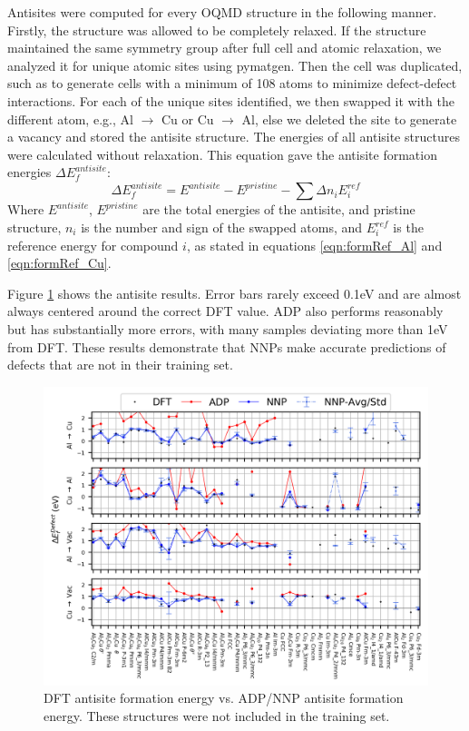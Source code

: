\documentclass{article}
\begin{document}
Antisites were computed for every OQMD structure in the following manner.
Firstly, the structure was allowed to be completely relaxed.
If the structure maintained the same symmetry group after full cell and atomic relaxation, we analyzed it for unique atomic sites using pymatgen.
Then the cell was duplicated, such as to generate cells with a minimum of 108 atoms to minimize defect-defect interactions.
For each of the unique sites identified, we then swapped it with the different atom, e.g., Al $\rightarrow$ Cu or Cu $\rightarrow$ Al, else we deleted the site to generate a vacancy and stored the antisite structure.
The energies of all antisite structures were calculated without relaxation.
This equation gave the antisite formation energies $\Delta E^{antisite}_f$:
\begin{equation}
\Delta E^{antisite}_f = E^{antisite} - E^{pristine} - \sum\Delta n_i E^{ref}_i
\end{equation}
Where $E^{antisite}$, $E^{pristine}$ are the total energies of the antisite, and pristine structure, $n_i$ is the 
number and sign of the swapped atoms, and $E^{ref}_i$ is the reference energy for compound $i$, as stated in 
equations \ref{eqn:formRef_Al} and \ref{eqn:formRef_Cu}.

Figure \ref{fig:antisite_plot} shows the antisite results.
Error bars rarely exceed 0.1eV and are almost always centered around the correct DFT value.
ADP also performs reasonably but has substantially more errors, with many samples deviating more than 1eV from DFT.
These results demonstrate that NNPs make accurate predictions of defects that are not in their training set. 

\begin{figure}[H]%
\centering%
\includegraphics[width=1\textwidth,center]{figures/antisite_vacancies.png}%
\caption{DFT antisite formation energy vs. ADP/NNP antisite formation energy.
These structures were not included in the training set.}%
\label{fig:antisite_plot}
\end{figure}
\end{document}
